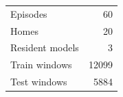 \begin{tabular}{lr}\toprule
Episodes & 60 \\
 Homes & 20 \\
 Resident models & 3 \\
Train windows & 12099 \\
 Test windows & 5884 \\
\bottomrule\end{tabular}
